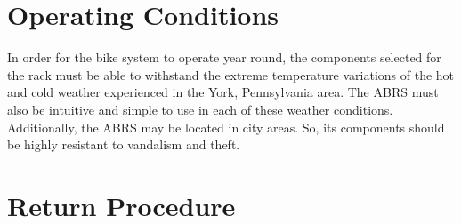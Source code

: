 \documentclass[11pt,a4paper,onesides]{report}
\begin{document}
\section{Operating Conditions}

In order for the bike system to operate year round, the components selected for the rack must be able to withstand the extreme temperature variations of the hot and cold weather experienced in the York, Pennsylvania area.  The ABRS must also be intuitive and simple to use in each of these weather conditions.  Additionally, the ABRS may be located in city areas.  So, its components should be highly resistant to vandalism and theft. 

\section{Return Procedure}
\end{document}
